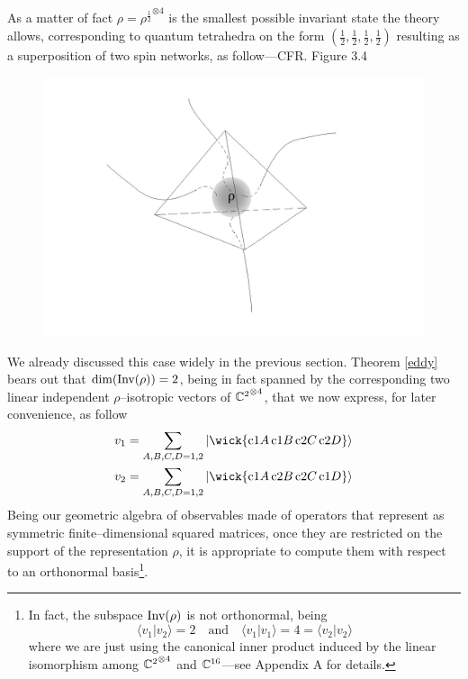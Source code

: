 As a matter of fact $\rho={\rho^{\frac{1}{2}}}^{\otimes4}$ is the smallest possible invariant state the theory allows, corresponding to quantum tetrahedra on the form $(\frac{1}{2}, \frac{1}{2}, \frac{1}{2}, \frac{1}{2})$ resulting as a superposition of two spin networks, as follow---CFR. Figure 3.4

\begin{figure}[ht]
    \centering
    \includegraphics[scale=0.3]{images/1half_tetrahedron.jpeg}
\end{figure}

We already discussed this case widely in the previous section. Theorem \ref{eddy} bears out that $\dim(\text{\normalfont Inv}(\rho))=2$, being in fact spanned by the corresponding two linear independent $\rho$--isotropic vectors of ${\mathbb{C}^2}^{\otimes4}$, that we now express, for later convenience, as follow
\begin{align*}
    v_1&=\sum_{A,B,C,D=1,2}\ket{\wick{\c1{A}\,\c1{B}\,\c2{C}\,\c2{D}}}\\
    v_2&=\sum_{A,B,C,D=1,2}\ket{\wick{\c1{A}\,\c2{B}\,\c2{C}\,\c1{D}}}
\end{align*}
Being our geometric algebra of observables made of operators that represent as symmetric finite--dimensional squared matrices, once they are restricted on the support of the representation $\rho$, it is appropriate to compute them with respect to an orthonormal basis\footnote{In fact, the subspace $\text{\normalfont Inv}(\rho)$ is not orthonormal, being 
$$\langle v_1|v_2\rangle=2\quad\text{and}\quad \langle v_1|v_1\rangle=4=\langle v_2|v_2\rangle$$
where we are just using the canonical inner product induced by the linear isomorphism among ${\mathbb{C}^2}^{\otimes4}$ and $ \mathbb{C}^{16}$---see Appendix A for details.}. 

